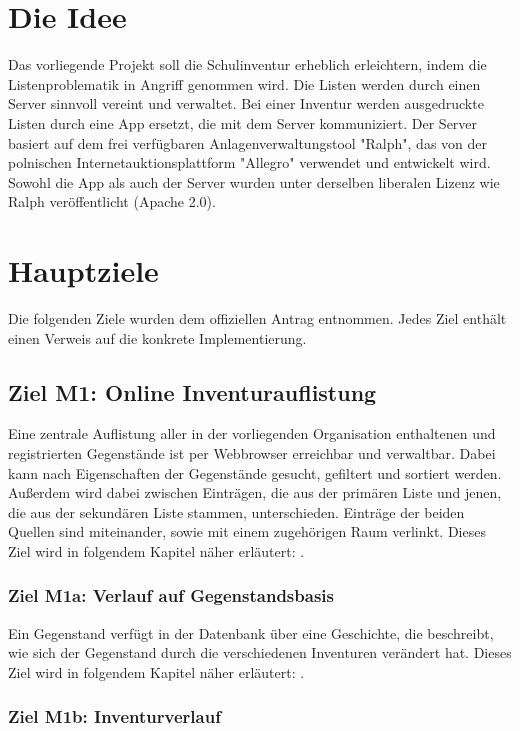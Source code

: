 \documentclass[
    headings=optiontotocandhead,%
    twoside,
    numbers=noenddot,%
    toc=flat, %
    12pt, %
    titlepage, %
    parskip=full, %
    listof=totoc, %
    listof=flat, %
    numbers=noenddot, %
    bibliography=totoc, %
    a4paper,DIV=14,
    BCOR=15mm,
]{scrbook}
\begin{document}
\section{Die Idee}

Das vorliegende Projekt soll die Schulinventur erheblich erleichtern, indem die Listenproblematik in Angriff genommen wird. Die Listen werden durch einen Server sinnvoll vereint und verwaltet. Bei einer Inventur werden ausgedruckte Listen durch eine App ersetzt, die mit dem Server kommuniziert. 
Der Server basiert auf dem frei verfügbaren Anlagenverwaltungstool "Ralph", das von der polnischen Internetauktionsplattform "Allegro" verwendet und entwickelt wird. Sowohl die App als auch der Server wurden unter derselben liberalen Lizenz wie Ralph veröffentlicht (Apache 2.0)\cite{ralph}. 
\section{Hauptziele}


Die folgenden Ziele wurden dem offiziellen Antrag entnommen. Jedes Ziel enthält einen Verweis auf die konkrete Implementierung.

\subsection*{Ziel M1: Online Inventurauflistung}

Eine zentrale Auflistung aller in der vorliegenden Organisation enthaltenen und registrierten Gegenstände ist per Webbrowser erreichbar und verwaltbar. Dabei kann nach Eigenschaften der Gegenstände gesucht, gefiltert und sortiert werden. Außerdem wird dabei zwischen Einträgen, die aus der primären Liste und jenen, die aus der sekundären Liste stammen, unterschieden. Einträge der beiden Quellen sind miteinander, sowie mit einem zugehörigen Raum verlinkt. 
Dieses Ziel wird in folgendem Kapitel näher erläutert: .

  \subsubsection*{Ziel M1a: Verlauf auf Gegenstandsbasis}

  Ein Gegenstand verfügt in der Datenbank über eine Geschichte, die beschreibt, wie sich der Gegenstand durch die verschiedenen Inventuren verändert hat.
  Dieses Ziel wird in folgendem Kapitel näher erläutert: .

  \subsubsection*{Ziel M1b: Inventurverlauf}
\end{document}
